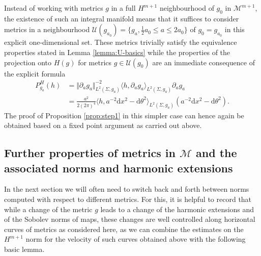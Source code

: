 \documentclass[10pt,reqno]{amsart}
\theoremstyle{plain}
\theoremstyle{definition}
\numberwithin{equation}{section}
\newcommand{\Si}{\Sigma}
\newcommand{\norm}[1]{\Vert#1\Vert}
\newcommand{\beqas}{\begin{equation*}\begin{aligned}}
\newcommand{\eeqas}{\end{aligned}\end{equation*}}
\newcommand{\half}{\frac{1}{2}}
\newcommand{\dd}{\mathrm{d}} %
\newcommand{\MM}{\mathcal{M}} %
\newcommand{\UU}{{\mathcal U}}
\newcommand{\inner}[2]{\langle #1, #2\rangle} %
\begin{document}
Instead of working with metrics $g$ in a full $H^{m+1}$ neighbourhood of $g_0$ in $\MM^{m+1}$, the existence of such an integral manifold means that it suffices to consider metrics in a neighbourhood $\UU(g_{a_0})=\{g_a, \half a_0\leq a\leq 2 a_0\}$ of $g_0=g_{a_0}$ in this explicit one-dimensional set. These metrics trivially satisfy the equivalence properties stated in Lemma \ref{lemma:U-basics} while the properties of the projection onto $H(g)$ for metrics $g\in \UU(g_0)$ are an immediate consequence of the explicit formula 
\beqas
    P_{g_a}^H(h) &= \norm{\partial_a g_a}_{L^2(\Si,g_a)}^{-2} \inner{h}{\partial_a g_a}_{L^2(\Si,g_a)} \partial_a g_a\\
    &= \frac{a^2}{2(2\pi)^4}\inner{h}{a^{-2}\dd x^2 - \dd \theta^2}_{L^2(\Si,g_a)}\left(a^{-2}\dd x^2 - \dd \theta^2\right).
\eeqas
The proof of Proposition \ref{prop:step1} in this simpler case can hence again be obtained based on a fixed point argument as carried out above.


\subsection{Further properties of metrics in $\MM$ and the associated norms and harmonic extensions}\label{subsec:metric-useful}
In the next section we will often need to switch back and forth between norms computed with respect to different metrics. For this, it is helpful to record that while a change of the metric $g$ leads to a change of the harmonic extensions and of the Sobolev norms of maps, these changes are well controlled along horizontal curves of metrics as considered here, as we can combine the estimates on the $H^{m+1}$ norm for the velocity of such curves obtained above with the following basic lemma.  
\end{document}
